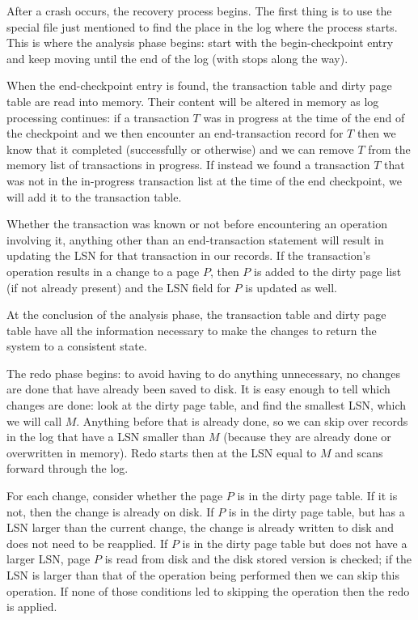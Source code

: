After a crash occurs, the recovery process begins. The first thing is to use the special file just mentioned to find the place in the log where the process starts. This is where the analysis phase begins: start with the begin-checkpoint entry and keep moving until the end of the log (with stops along the way). 

When the end-checkpoint entry is found, the transaction table and dirty page table are read into memory. Their content will be altered in memory as log processing continues: if a transaction $T$ was in progress at the time of the end of the checkpoint and we then encounter an end-transaction record for $T$ then we know that it completed (successfully or otherwise) and we can remove $T$ from the memory list of transactions in progress. If instead we found a transaction $T$ that was not in the in-progress transaction list at the time of the end checkpoint, we will add it to the transaction table. 

Whether the transaction was known or not before encountering an operation involving it, anything other than an end-transaction statement will result in updating the LSN for that transaction in our records. If the transaction's operation results in a change to a page $P$, then $P$ is added to the dirty page list (if not already present) and the LSN field for $P$ is updated as well. 

At the conclusion of the analysis phase, the transaction table and dirty page table have all the information necessary to make the changes to return the system to a consistent state.

The redo phase begins: to avoid having to do anything unnecessary, no changes are done that have already been saved to disk. It is easy enough to tell which changes are done: look at the dirty page table, and find the smallest LSN, which we will call $M$. Anything before that is already done, so we can skip over records in the log that have a LSN smaller than $M$ (because they are already done or overwritten in memory). Redo starts then at the LSN equal to $M$ and scans forward through the log. 

For each change, consider whether the page $P$ is in the dirty page table. If it is not, then the change is already on disk. If $P$ is in the dirty page table, but has a LSN larger than the current change, the change is already written to disk and does not need to be reapplied. If $P$ is in the dirty page table but does not have a larger LSN, page $P$ is read from disk and the disk stored version is checked; if the LSN is larger than that of the operation being performed then we can skip this operation.  If none of those conditions led to skipping the operation then the redo is applied. 

